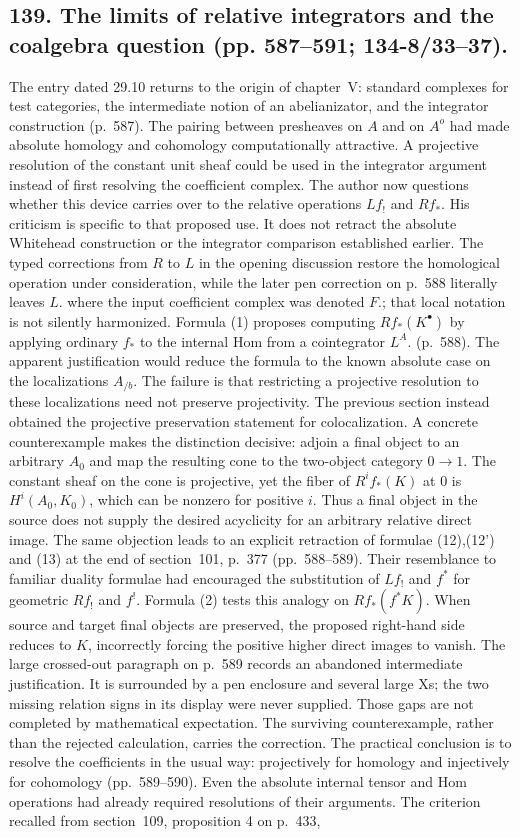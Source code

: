 \documentclass[10pt,oneside]{book}
\begin{document}
\subsection*{139. The limits of relative integrators and the coalgebra question (pp. 587--591; 134-8/33--37).}
The entry dated 29.10 returns to the origin of chapter~V: standard complexes for test categories, the intermediate notion of an abelianizator, and the integrator construction (p.~587). The pairing between presheaves on $A$ and on $A^o$ had made absolute homology and cohomology computationally attractive. A projective resolution of the constant unit sheaf could be used in the integrator argument instead of first resolving the coefficient complex. The author now questions whether this device carries over to the relative operations $Lf_!$ and $Rf_*$. His criticism is specific to that proposed use. It does not retract the absolute Whitehead construction or the integrator comparison established earlier. The typed corrections from $R$ to $L$ in the opening discussion restore the homological operation under consideration, while the later pen correction on p.~588 literally leaves $L.$ where the input coefficient complex was denoted $F.$; that local notation is not silently harmonized. Formula (1) proposes computing $Rf_*(K^\bullet)$ by applying ordinary $f_*$ to the internal Hom from a cointegrator $L^A.$ (p.~588). The apparent justification would reduce the formula to the known absolute case on the localizations $A_{/b}$. The failure is that restricting a projective resolution to these localizations need not preserve projectivity. The previous section instead obtained the projective preservation statement for colocalization. A concrete counterexample makes the distinction decisive: adjoin a final object to an arbitrary $A_0$ and map the resulting cone to the two-object category $0\to1$. The constant sheaf on the cone is projective, yet the fiber of $R^if_*(K)$ at 0 is $H^i(A_0,K_0)$, which can be nonzero for positive $i$. Thus a final object in the source does not supply the desired acyclicity for an arbitrary relative direct image. The same objection leads to an explicit retraction of formulae (12),(12') and (13) at the end of section~101, p.~377 (pp.~588--589). Their resemblance to familiar duality formulae had encouraged the substitution of $Lf_!$ and $f^*$ for geometric $Rf_!$ and $f^!$. Formula (2) tests this analogy on $Rf_*(f^*K)$. When source and target final objects are preserved, the proposed right-hand side reduces to $K$, incorrectly forcing the positive higher direct images to vanish. The large crossed-out paragraph on p.~589 records an abandoned intermediate justification. It is surrounded by a pen enclosure and several large Xs; the two missing relation signs in its display were never supplied. Those gaps are not completed by mathematical expectation. The surviving counterexample, rather than the rejected calculation, carries the correction. The practical conclusion is to resolve the coefficients in the usual way: projectively for homology and injectively for cohomology (pp.~589--590). Even the absolute internal tensor and Hom operations had already required resolutions of their arguments. The criterion recalled from section~109, proposition 4 on p.~433, 
\end{document}
